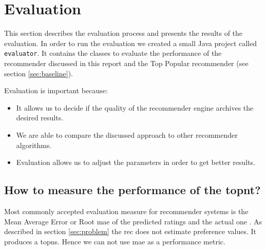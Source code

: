 \section{Evaluation}
\label{sec:evaluation}

This section describes the evaluation process and presents the results of the evaluation. In order to run the evaluation we created a small Java project called \verb|evaluator|. It contains the classes to evaluate the performance of the recommender discussed in this report and the Top Popular recommender (see section \ref{sec:baseline}).

Evaluation is important because:
\begin{itemize}
  \item It allows us to decide if the quality of the recommender engine archives the desired results. 
  \item We are able to compare the discussed approach to other recommender algorithms. 
  \item Evaluation allows us to adjust the parameters in order to get better results.
\end{itemize}

\subsection{How to measure the performance of the \gls{topnt}?}

Most commonly accepted evaluation measure for recommender systems is the Mean Average Error or Root \gls{mae} of the predicted ratings and the actual one \cite{Ricci}\cite{jannach11}.
As described in section \ref{sec:problem} the \gls{rec} does not estimate preference values. It produces a \glspl{topn}. Hence we can not use \gls{mae} as a performance metric. 

